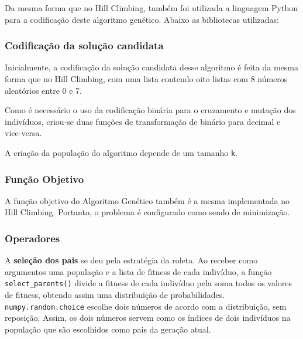 Da mesma forma que no Hill Climbing, também foi utilizada a linguagem Python para a codificação deste algoritmo genético. Abaixo as bibliotecas utilizadas:



\subsubsection{Codificação da solução candidata}

Inicialmente, a codificação da solução candidata desse algoritmo é feita da mesma forma que no Hill Climbing, com uma lista contendo oito listas com 8 números aleatórios entre 0 e 7.



Como é necessário o uso da codificação binária para o cruzamento e mutação dos indivíduos, criou-se duas funções de transformação de binário para decimal e vice-versa.



A criação da população do algoritmo depende de um tamanho \verb|k|.



\subsubsection{Função Objetivo}

A função objetivo do Algoritmo Genético também é a mesma implementada no Hill Climbing. Portanto, o problema é configurado como sendo de minimização.



\subsubsection{Operadores}

A \textbf{seleção dos pais} se deu pela estratégia da roleta. Ao receber como argumentos uma população e a lista de fitness de cada indivíduo, a função \verb*|select_parents()| divide a fitness de cada indivíduo pela soma todos os valores de fitness, obtendo assim uma distribuição de probabilidades. \verb*|numpy.random.choice| escolhe dois números de acordo com a distribuição, sem reposição. Assim, os dois números servem como os índices de dois indivíduos na população que são escolhidos como pais da geração atual.

